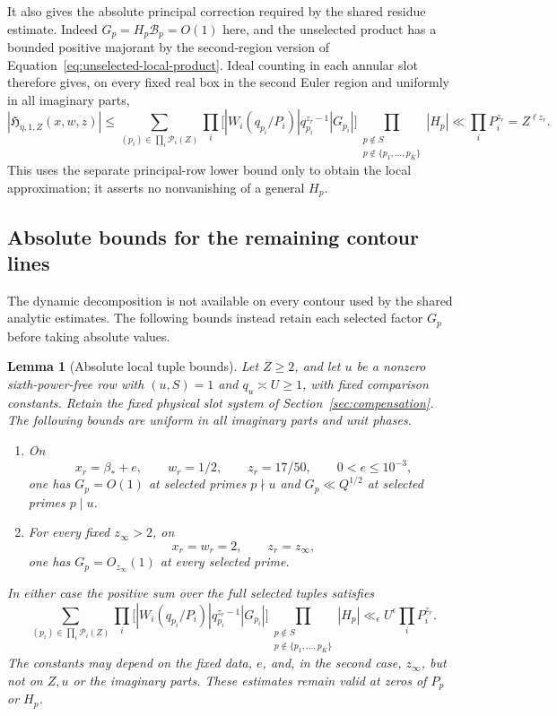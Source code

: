 \documentclass[11pt,a4paper]{article}
\numberwithin{equation}{section}
\numberwithin{figure}{section}
\newtheorem{lemma}[theorem]{Lemma}
\theoremstyle{definition}
\theoremstyle{remark}
\begin{document}
It also gives the absolute principal correction required by the shared
residue estimate.  Indeed $G_p=H_p\mathcal B_p=O(1)$ here, and the
unselected product has a bounded positive majorant by the second-region
version of Equation~\eqref{eq:unselected-local-product}.  Ideal counting
in each annular slot therefore gives, on every fixed real box in the second
Euler region and uniformly in all imaginary parts,
\begin{equation}\label{eq:principal-local-tuple-bound}
 |\mathfrak H_{\eta,1,Z}(x,w,z)|
 \le\sum_{(p_i)\in\prod_i\mathcal P_i(Z)}
       \prod_i\bigl[|W_i(q_{p_i}/P_i)|q_{p_i}^{z_r-1}|G_{p_i}|\bigr]
       \prod_{\substack{p\notin S\\p\notin\{p_1,\ldots,p_K\}}}|H_p|
 \ll \prod_iP_i^{z_r}=Z^{\ell z_r}.
\end{equation}
This uses the separate principal-row lower bound only to obtain the local
approximation; it asserts no nonvanishing of a general $H_p$.

\subsection{Absolute bounds for the remaining contour lines}

The dynamic decomposition is not available on every contour used by the
shared analytic estimates.  The following bounds instead retain each
selected factor $G_p$ before taking absolute values.

\begin{lemma}[Absolute local tuple bounds]
\label{lem:compensated-absolute-local-bounds}
Let $Z\ge2$, and let $u$ be a nonzero sixth-power-free row with $(u,S)=1$ and
$q_u\asymp U\ge1$, with fixed comparison constants.  Retain the fixed
physical slot system of Section~\ref{sec:compensation}.  The following
bounds are uniform in all imaginary parts and unit phases.
\begin{enumerate}
\item On
\[
 x_r=\beta_*+e,\qquad w_r=1/2,\qquad z_r=17/50,
 \qquad 0<e\le10^{-3},
\]
one has $G_p=O(1)$ at selected primes $p\nmid u$ and
$G_p\ll Q^{1/2}$ at selected primes $p\mid u$.
\item For every fixed $z_\infty>2$, on
\[
 x_r=w_r=2,\qquad z_r=z_\infty,
\]
one has $G_p=O_{z_\infty}(1)$ at every selected prime.
\end{enumerate}
In either case the positive sum over the full selected tuples satisfies
\begin{equation}\label{eq:absolute-local-tuple-bound}
 \sum_{(p_i)\in\prod_i\mathcal P_i(Z)}
       \prod_i\bigl[|W_i(q_{p_i}/P_i)|q_{p_i}^{z_r-1}|G_{p_i}|\bigr]
       \prod_{\substack{p\notin S\\p\notin\{p_1,\ldots,p_K\}}}|H_p|
 \ll_\epsilon U^\epsilon\prod_iP_i^{z_r}.
\end{equation}
The constants may depend on the fixed data, $e$, and, in the second case,
$z_\infty$, but not on $Z,u$ or the imaginary parts.  These estimates remain
valid at zeros of $P_p$ or $H_p$.
\end{lemma}
\end{document}
